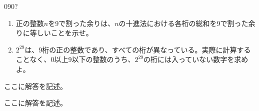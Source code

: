 \begin{thm}{090}{\hosi ?}{}
 \begin{enumerate}
  \item 正の整数$n$を9で割った余りは、$n$の十進法における各桁の総和を9で割った余りに等しいことを示せ。
  \item $2^{29}$は、9桁の正の整数であり、すべての桁が異なっている。実際に計算することなく、0以上9以下の整数のうち、$2^{29}$の桁には入っていない数字を求めよ。
 \end{enumerate}
\end{thm}

ここに解答を記述。

ここに解答を記述。